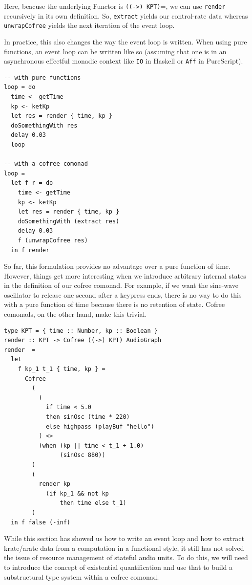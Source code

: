 \documentclass{article}
\begin{document}
Here, beacuse the underlying Functor is \texttt{((->) KPT)}=, we can use \texttt{render} recursively in its own definition. So, \texttt{extract} yields our control-rate data whereas \texttt{unwrap\-Cofree} yields the next iteration of the event loop.

In practice, this also changes the way the event loop is written. When using pure functions, an event loop can be written like so (assuming that one is in an asynchronous effectful monadic context like \texttt{IO} in Haskell or \texttt{Aff} in PureScript).

\lstset{language=Haskell, style=psstyle}
\begin{lstlisting}
-- with pure functions
loop = do
  time <- getTime
  kp <- ketKp
  let res = render { time, kp }
  doSomethingWith res
  delay 0.03
  loop

-- with a cofree comonad
loop =
  let f r = do
    time <- getTime
    kp <- ketKp
    let res = render { time, kp }
    doSomethingWith (extract res)
    delay 0.03
    f (unwrapCofree res)
  in f render
\end{lstlisting}

So far, this formulation provides no advantage over a pure function of time. However, things get more interesting when we introduce arbitrary internal states in the definition of our cofree comonad. For example, if we want the sine-wave oscillator to release one second after a keypress ends, there is no way to do this with a pure function of time because there is no retention of state. Cofree comonads, on the other hand, make this trivial.

\lstset{language=Haskell, style=psstyle}
\begin{lstlisting}
type KPT = { time :: Number, kp :: Boolean }
render :: KPT -> Cofree ((->) KPT) AudioGraph
render  =
  let
    f kp_1 t_1 { time, kp } =
      Cofree
        (
          (
            if time < 5.0
            then sinOsc (time * 220)
            else highpass (playBuf "hello")
          ) <>
          (when (kp || time < t_1 + 1.0)
                (sinOsc 880))
        )
        (
          render kp
            (if kp_1 && not kp
                then time else t_1)
        )
  in f false (-inf)
\end{lstlisting}

While this section has showed us how to write an event loop and how to extract krate/arate data from a computation in a functional style, it still has not solved the issue of resource management of stateful audio units. To do this, we will need to introduce the concept of existential quantification and use that to build a substructural type system within a cofree comonad.
\end{document}

